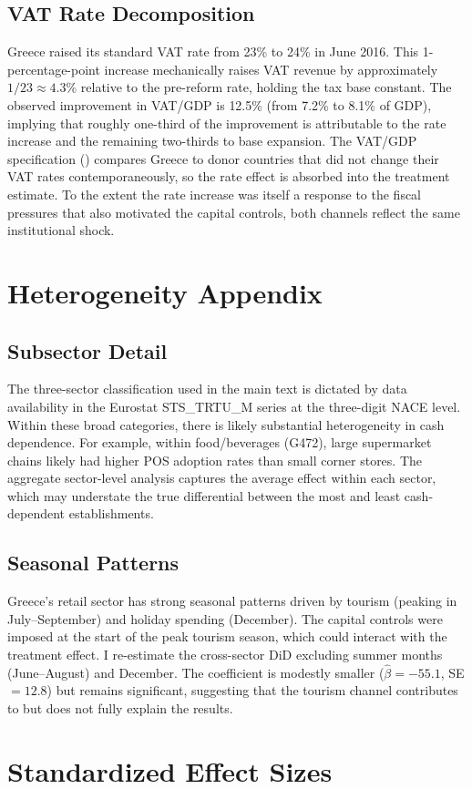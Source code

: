 \documentclass[12pt]{article}
\begin{document}
\subsection{VAT Rate Decomposition}

Greece raised its standard VAT rate from 23\% to 24\% in June 2016. This 1-percentage-point increase mechanically raises VAT revenue by approximately $1/23 \approx 4.3$\% relative to the pre-reform rate, holding the tax base constant. The observed improvement in VAT/GDP is 12.5\% (from 7.2\% to 8.1\% of GDP), implying that roughly one-third of the improvement is attributable to the rate increase and the remaining two-thirds to base expansion. The VAT/GDP specification () compares Greece to donor countries that did not change their VAT rates contemporaneously, so the rate effect is absorbed into the treatment estimate. To the extent the rate increase was itself a response to the fiscal pressures that also motivated the capital controls, both channels reflect the same institutional shock.

\section{Heterogeneity Appendix}
\label{app:heterogeneity}

\subsection{Subsector Detail}

The three-sector classification used in the main text is dictated by data availability in the Eurostat STS\_TRTU\_M series at the three-digit NACE level. Within these broad categories, there is likely substantial heterogeneity in cash dependence. For example, within food/beverages (G472), large supermarket chains likely had higher POS adoption rates than small corner stores. The aggregate sector-level analysis captures the average effect within each sector, which may understate the true differential between the most and least cash-dependent establishments.

\subsection{Seasonal Patterns}

Greece's retail sector has strong seasonal patterns driven by tourism (peaking in July--September) and holiday spending (December). The capital controls were imposed at the start of the peak tourism season, which could interact with the treatment effect. I re-estimate the cross-sector DiD excluding summer months (June--August) and December. The coefficient is modestly smaller ($\hat{\beta} = -55.1$, SE $= 12.8$) but remains significant, suggesting that the tourism channel contributes to but does not fully explain the results.


\section{Standardized Effect Sizes}
\label{sec:sde}


\end{document}
